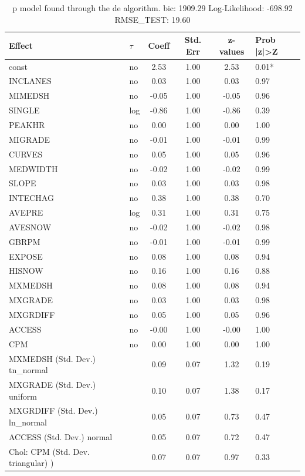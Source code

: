 \begin{table}
	\caption{p model found through the de algorithm. bic: 1909.29 Log-Likelihood: -698.92 RMSE_TEST: 19.60}
	\begin{center}
		\begin{tabular}{|l|l|c|c|c|l|}
			\hline
			Effect & $\tau$ & Coeff & Std. Err & z-values & Prob |z|>Z \\
			\hline
			const & no & 2.53 & 1.00 & 2.53 & 0.01* \\
			\hline
			INCLANES & no & 0.03 & 1.00 & 0.03 & 0.97 \\
			\hline
			MIMEDSH & no & -0.05 & 1.00 & -0.05 & 0.96 \\
			\hline
			SINGLE & log & -0.86 & 1.00 & -0.86 & 0.39 \\
			\hline
			PEAKHR & no & 0.00 & 1.00 & 0.00 & 1.00 \\
			\hline
			MIGRADE & no & -0.01 & 1.00 & -0.01 & 0.99 \\
			\hline
			CURVES & no & 0.05 & 1.00 & 0.05 & 0.96 \\
			\hline
			MEDWIDTH & no & -0.02 & 1.00 & -0.02 & 0.99 \\
			\hline
			SLOPE & no & 0.03 & 1.00 & 0.03 & 0.98 \\
			\hline
			INTECHAG & no & 0.38 & 1.00 & 0.38 & 0.70 \\
			\hline
			AVEPRE & log & 0.31 & 1.00 & 0.31 & 0.75 \\
			\hline
			AVESNOW & no & -0.02 & 1.00 & -0.02 & 0.98 \\
			\hline
			GBRPM & no & -0.01 & 1.00 & -0.01 & 0.99 \\
			\hline
			EXPOSE & no & 0.08 & 1.00 & 0.08 & 0.94 \\
			\hline
			HISNOW & no & 0.16 & 1.00 & 0.16 & 0.88 \\
			\hline
			MXMEDSH & no & 0.08 & 1.00 & 0.08 & 0.94 \\
			\hline
			MXGRADE & no & 0.03 & 1.00 & 0.03 & 0.98 \\
			\hline
			MXGRDIFF & no & 0.05 & 1.00 & 0.05 & 0.96 \\
			\hline
			ACCESS & no & -0.00 & 1.00 & -0.00 & 1.00 \\
			\hline
			CPM & no & 0.00 & 1.00 & 0.00 & 1.00 \\
			\hline
			MXMEDSH (Std. Dev.) tn_normal &  & 0.09 & 0.07 & 1.32 & 0.19 \\
			\hline
			MXGRADE (Std. Dev.) uniform &  & 0.10 & 0.07 & 1.38 & 0.17 \\
			\hline
			MXGRDIFF (Std. Dev.) ln_normal &  & 0.05 & 0.07 & 0.73 & 0.47 \\
			\hline
			ACCESS (Std. Dev.) normal &  & 0.05 & 0.07 & 0.72 & 0.47 \\
			\hline
			 Chol: CPM (Std. Dev. triangular) ) &  & 0.07 & 0.07 & 0.97 & 0.33 \\
			\hline
		\end{tabular}
	\end{center}
\end{table}